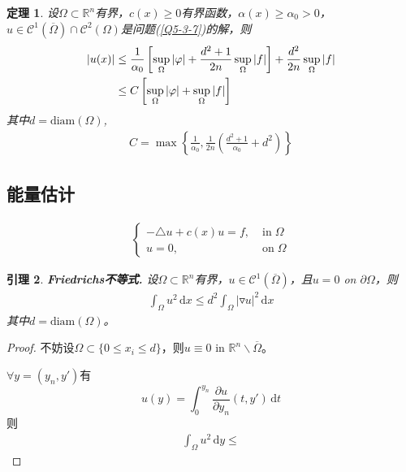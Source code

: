 \documentclass[11pt, a4paper]{article}
\theoremstyle{theorem}
\newtheorem{thm}{定理}[section]
\newtheorem{lemma}[thm]{引理}
\newcommand{\intd}[1]{\,\mathrm{d}{#1}}
\begin{document}
\begin{thm}
设$\Omega \subset \mathbb{R}^n$有界，$c(x) \geq 0$有界函数，$\alpha(x) \geq \alpha_0 > 0$， $u \in \mathcal{C}^1(\overline{\Omega}) \cap \mathcal{C}^2(\Omega)$是问题(\ref{Q5-3-7})的解，则
\begin{align}
    |u(x)|
    &\leq \frac{1}{\alpha_0} \left[\sup\limits_{\Omega} |\varphi| + \frac{d^2 + 1}{2n} \sup\limits_{\Omega} |f| \right] + \frac{d^2}{2n} \sup\limits_{\Omega} |f| \notag \\
    &\leq C \left[\sup\limits_{\Omega} |\varphi| + \sup\limits_{\Omega} |f|\right]
\end{align}
其中$d = \text{diam}(\Omega)$,
\begin{align}
    C = \max \left\{\frac{1}{\alpha_0}, \frac{1}{2n} \left(\frac{d^2 + 1}{\alpha_0} + d^2\right)\right\}
\end{align}
\end{thm}

\subsection{能量估计}

\begin{align}
    \label{Q5-4-1}
    \begin{cases}
      - \triangle u + c(x) u = f, \; &\text{in} \; \Omega \\
      u = 0, &\text{on} \; \Omega
    \end{cases}
\end{align}

\begin{lemma} \textbf{Friedrichs不等式. }
设$\Omega \subset \mathbb{R}^n$有界，$u \in \mathcal{C}^1(\overline{\Omega})$，且$u = 0$ on $\partial \Omega$，则
\begin{align}
    \int_\Omega u^2 \intd x \leq d^2 \int_\Omega |\triangledown u|^2 \intd x
\end{align}
其中$d = \text{diam}(\Omega)$。
\end{lemma}

\begin{proof}
  不妨设$\Omega \subset \{0 \leq x_i \leq d\}$，则$u \equiv 0$ in $\mathbb{R}^n \backslash \overline{\Omega}$。

  $\forall y = (y_n, y')$有
  $$
  u(y) = \int_0^{y_n} \frac{\partial u}{\partial y_n} (t, y') \intd t
  $$
  则
  \begin{align*}
      \int_\Omega u^2 \intd y \leq
  \end{align*}
\end{proof}
\end{document}
